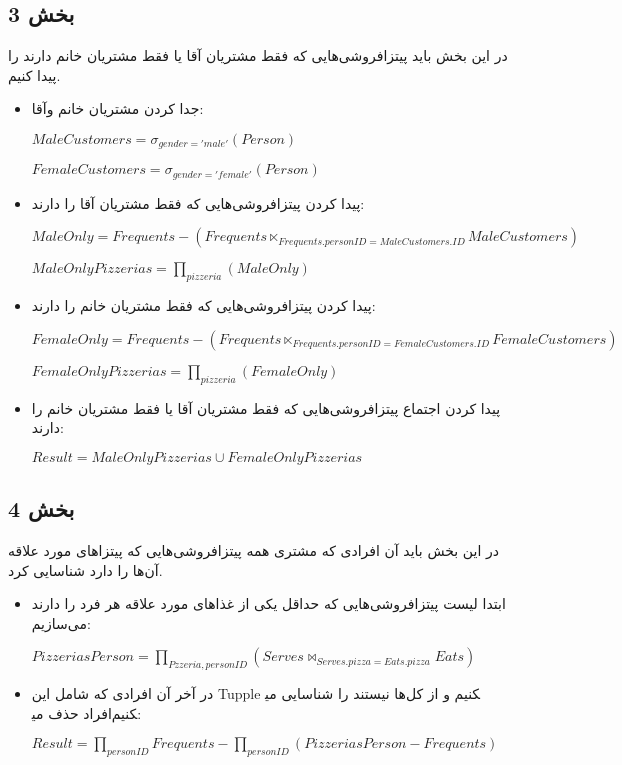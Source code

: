 \subsection*{بخش 3}
در این بخش باید پیتزافروشی‌هایی که فقط مشتریان آقا یا فقط مشتریان خانم دارند را پیدا کنیم.
\begin{itemize}	
	\item جدا کردن مشتریان خانم وآقا:
	
	\setLTR
	$MaleCustomers = \sigma_{gender = 'male'} (Person)$
	
	$FemaleCustomers = \sigma_{gender = 'female'} (Person)$
	\setRTL
	
	\item پیدا کردن پیتزافروشی‌هایی که فقط مشتریان آقا را دارند:
	
		\setLTR
$MaleOnly = Frequents - (Frequents \ltimes_{Frequents.personID=MaleCustomers.ID} MaleCustomers)$

$MaleOnlyPizzerias = \prod_{pizzeria} (MaleOnly)$
	\setRTL
	
		\item پیدا کردن پیتزافروشی‌هایی که فقط مشتریان خانم را دارند:
	
	\setLTR
	$FemaleOnly = Frequents - (Frequents \ltimes_{Frequents.personID=FemaleCustomers.ID} FemaleCustomers)$
	
	$FemaleOnlyPizzerias = \prod_{pizzeria} (FemaleOnly)$
	\setRTL
	
	\item پیدا کردن اجتماع پیتزافروشی‌هایی که فقط مشتریان آقا یا فقط مشتریان خانم را دارند:
	
		\setLTR
	$Result = MaleOnlyPizzerias \cup FemaleOnlyPizzerias$
	\setRTL
	
	
\end{itemize}


\subsection*{بخش 4}
در این بخش باید آن افرادی که مشتری همه پیتزافروشی‌هایی که پیتزاهای مورد علاقه آن‌ها را دارد شناسایی کرد.
\begin{itemize}	
	\item
	ابتدا لیست پیتزافروشی‌هایی که حداقل یکی از غذاهای مورد علاقه هر فرد را دارند می‌سازیم:
	
\setLTR
$PizzeriasPerson =\prod_{Pzzeria,personID} (Serves \bowtie_{Serves.pizza =Eats.pizza}Eats)$
\setRTL

	\item 
	در آخر آن افرادی که شامل این Tupple ها نیستند را شناسایی می‎کنیم و از کل افراد حذف می‎کنیم:
	
	\setLTR
	
	$Result = \prod_{personID}Frequents - \prod_{personID}(PizzeriasPerson - Frequents)$
	

	\setRTL
\end{itemize}


